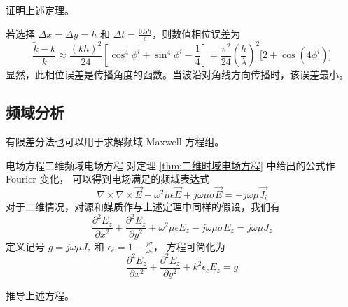 \begin{exercise}
    证明上述定理。
\end{exercise}

\begin{example}
    若选择 $\Delta x=\Delta y = h$ 和 $\Delta t = \frac{0.5h}{c}$，则数值相位误差为
    \begin{equation*}
        \frac{\tilde{k}-k}{k}
        \approx\frac{(kh)^2}{24}
        \left[\cos^4\phi^i+\sin^4\phi^i-\frac{1}{4}\right]
        =\frac{\pi^2}{24}\left(\frac{h}{\lambda}\right)^2\Big[2+\cos(4\phi^i)\Big]
    \end{equation*}
    显然，此相位误差是传播角度的函数。当波沿对角线方向传播时，该误差最小。
\end{example}

\subsection{频域分析}

\par 有限差分法也可以用于求解频域 Maxwell 方程组。

\begin{theorem}{电场方程}{二维频域电场方程}
    对定理 \ref{thm:二维时域电场方程} 中给出的公式作 Fourier 变化，
    可以得到电场满足的频域表达式
    \begin{equation}
        \nabla \times \nabla \times \vec{E}
        -\omega^2\mu \epsilon  \vec{E}
        +j\omega \mu \sigma \vec{E}
        =-j\omega\mu \vec{J_i}
    \end{equation}
    对于二维情况，对源和媒质作与上述定理中同样的假设，我们有
    \begin{equation}
        \frac{\partial^2 E_z}{\partial x^2}
        +\frac{\partial^2 E_z}{\partial y^2}
        +\omega^2\mu \epsilon  E_z
        -j\omega \mu \sigma E_z
        =j\omega\mu J_z
        \label{二维频域电场方程}
    \end{equation}
    定义记号 $g=j\omega \mu J_z$ 和 $\epsilon_c=1-\frac{j\sigma}{\omega \epsilon}$，
    方程可简化为
    \begin{equation}
        \frac{\partial^2 E_z}{\partial x^2}
        +\frac{\partial^2 E_z}{\partial y^2}
        +k^2\epsilon_c  E_z
        =g
    \end{equation}
\end{theorem}

\begin{exercise}
    推导上述方程。
\end{exercise}

